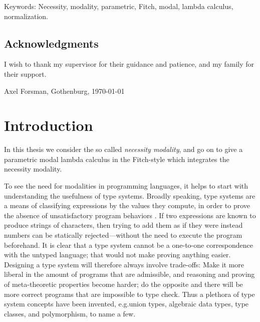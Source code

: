 \documentclass[12pt,twoside,openright]{report}
\numberwithin{equation}{chapter}
\numberwithin{figure}{chapter}
\numberwithin{table}{chapter}
\theoremstyle{definition}\newtheorem{definition}{Definition}
\begin{document}
\vfill
Keywords: Necessity, modality, parametric, Fitch, modal, lambda calculus, normalization.

\newpage
\thispagestyle{empty}
\mbox{}

\newpage
\thispagestyle{plain}
\section*{Acknowledgments}

I wish to thank my supervisor for their guidance and patience,
and my family for their support.

\vspace{1.5cm}\hfill
Axel Forsman, Gothenburg, \today

\newpage
\thispagestyle{empty}
\mbox{}

\newpage
\tableofcontents

\cleardoublepage
{}
\listoffigures

\cleardoublepage
\setcounter{page}{1}

\chapter{Introduction}

In this thesis we consider the so called \emph{necessity modality},
and go on to give a parametric modal lambda calculus in the Fitch-style
which integrates the necessity modality.

To see the need for modalities in programming languages,
it helps to start with understanding the usefulness of type systems.
Broadly speaking,
type systems are a means of classifying expressions by the values they compute,
in order to prove the absence of unsatisfactory program behaviors \cite{pierce02}.
If two expressions are known to produce strings of characters,
then trying to add them as if they were instead numbers
can be statically rejected---without the need to execute the program beforehand.
It is clear that a type system cannot be a one-to-one correspondence
with the untyped language;
that would not make proving anything easier.
Designing a type system will therefore always involve trade-offs:
Make it more liberal in the amount of programs that are admissible,
and reasoning and proving of meta-theoretic properties become harder;
do the opposite and there will be more correct programs
that are impossible to type check.
Thus a plethora of type system concepts have been invented,
e.g.\@ union types, algebraic data types, type classes, and polymorphism, to name a few.
\end{document}
